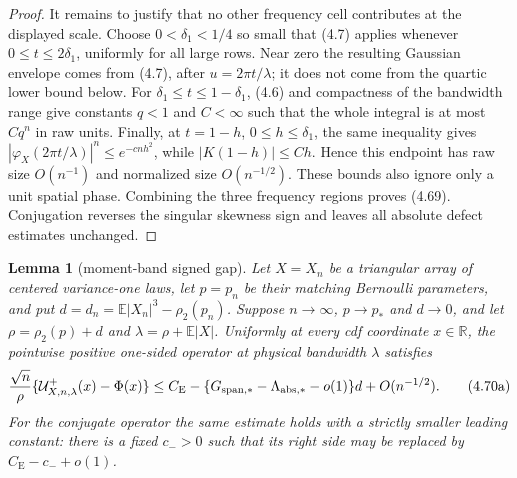 \documentclass[11pt,a4paper]{article}
\numberwithin{equation}{section}
\newtheorem{lemma}[theorem]{Lemma}
\theoremstyle{definition}
\theoremstyle{remark}
\newcommand{\E}{\mathbb E}
\newcommand{\CE}{C_{\mathrm E}}
\begin{document}
\begin{proof}
It remains to justify that no other frequency cell contributes at the
displayed scale.  Choose $0<\delta_1<1/4$ so small that (4.7) applies
whenever $0\le t\le2\delta_1$, uniformly for all large rows.  Near zero
the resulting Gaussian envelope comes from (4.7), after
$u=2\pi t/\lambda$; it does not come from the quartic lower bound below.
For $\delta_1\le t\le1-\delta_1$, (4.6) and compactness of the bandwidth
range give constants $q<1$ and $C<\infty$ such that the whole integral is
at most $Cq^n$ in raw units.  Finally, at
$t=1-h$, $0\le h\le\delta_1$, the same inequality gives
$|\varphi_X(2\pi t/\lambda)|^n\le e^{-cnh^2}$, while
$|K(1-h)|\le Ch$.  Hence this endpoint has raw size $O(n^{-1})$ and
normalized size $O(n^{-1/2})$.  These bounds also ignore only a unit
spatial phase.  Combining the three frequency regions proves (4.69).
Conjugation reverses the singular skewness sign and leaves all absolute
defect estimates unchanged.
\end{proof}

\begin{lemma}[moment-band signed gap]\label{orig:lem:momentbandgap}
Let $X=X_n$ be a triangular array of centered variance-one laws, let
$p=p_n$ be their matching Bernoulli parameters, and put
$d=d_n=\E|X_n|^3-\rho_2(p_n)$.  Suppose
$n\to\infty$, $p\to p_*$ and $d\to0$, and let
$\rho=\rho_2(p)+d$ and $\lambda=\rho+\E|X|$.  Uniformly at every
cdf coordinate $x\in\mathbb R$, the pointwise positive one-sided operator
at physical bandwidth $\lambda$ satisfies
\[
 {\sqrt n\over\rho}\{\mathcal U^+_{X,n,\lambda}(x)-\Phi(x)\}
 \le \CE-\{G_{\rm span,*}-\Lambda_{\rm abs,*}-o(1)\}d
             +O(n^{-1/2}).                              \tag{4.70a}
\]
For the conjugate operator the same estimate holds with a strictly smaller
leading constant: there is a fixed $c_->0$ such that its right side may be
replaced by $\CE-c_-+o(1)$.
\end{lemma}
\end{document}

